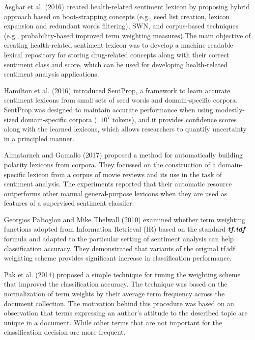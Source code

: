 \documentclass[a4paper, 10pt, conference]{ieeeconf}
\begin{document}
	Asghar et al.
	(2016) \cite{c2} created health-related sentiment lexicon by
	proposing hybrid approach based on boot-strapping concepts (e.g., seed list creation,
	lexicon expansion and redundant words filtering), SWN, and corpus-based techniques
	(e.g., probability-based improved term weighting measures).The main objective of creating health-related sentiment lexicon was to develop a
	machine readable lexical repository for storing drug-related concepts along with their
	correct sentiment class and score, which can be used for developing health-related sentiment
	analysis applications.
	
	Hamilton et al. (2016) \cite{c3} introduced SentProp, a framework to learn accurate sentiment lexicons from small sets of seed words and domain-specific corpora. SentProp was designed to maintain accurate performance when using modestly-sized domain-specific corpora (~$ 10^{7} $ tokens), and it provides confidence scores along with the learned lexicons, which allows researchers to quantify uncertainty in a principled manner.
	
	Almatarneh and Gamallo (2017) \cite{c4} proposed a method for automatically building polarity lexicons
	from corpora. They focussed on the construction of a domain-specific
	lexicon from a corpus of movie reviews and its use in the task of sentiment
	analysis. The experiments reported   that their automatic
	resource outperforms other manual general-purpose lexicons when they are used
	as features of a supervised sentiment classifer.    
	
	Georgios Paltoglou and Mike Thelwall (2010) \cite{c5}  examined whether term weighting
	functions adopted from Information Retrieval
	(IR) based on the standard \textbf{\textit{tf.idf}} formula and
	adapted to the particular setting of sentiment analysis
	can help classification accuracy. They demonstrated
	that variants of the original tf.idf weighting
	scheme provides significant increase in classification
	performance.
	
	
	Pak et al. (2014) \cite{c6} proposed a simple technique for tuning the weighting scheme that
	improved the classification accuracy. The technique was based on the normalization of
	term weights by their average term frequency across the document collection. The motivation
	behind this procedure was based on an observation that terms expressing an author’s
	attitude to the described topic are unique in a document. While other terms that
	are not important for the classification decision are more frequent.    
	
\end{document}
